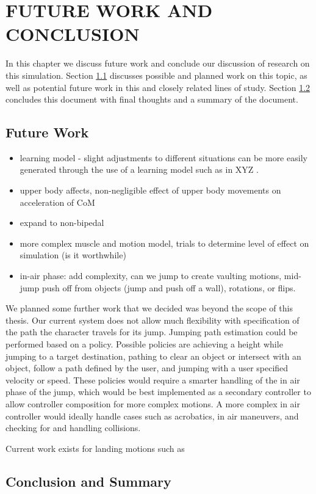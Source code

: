 
 
\chapter{FUTURE WORK AND CONCLUSION}
\label{chapter:future_work}
In this chapter we discuss future work and conclude our discussion of research on this simulation.  Section \ref{section:future_work} discusses possible and planned work on this topic, as well as potential future work in this and closely related lines of study.  Section \ref{section:conclusion} concludes this document with final thoughts and a summary of the document.

\section{Future Work}
\label{section:future_work}
\begin{itemize}
	\item learning model - slight adjustments to different situations can be more easily generated through the use of a learning model such as in XYZ \cite{falling_landing, muscle_based_bipeds}.
	\item upper body affects, non-negligible effect of upper body movements on acceleration of CoM
	\item expand to non-bipedal
	\item more complex muscle and motion model, trials to determine level of effect on simulation (is it worthwhile)
	\item in-air phase: add complexity, can we jump to create vaulting motions, mid-jump push off from objects (jump and push off a wall), rotations, or flips.
\end{itemize}

We planned some further work that we decided was beyond the scope of this thesis.  Our current system does not allow much flexibility with specification of the path the character travels for its jump.  Jumping path estimation could be performed based on a policy.  Possible policies are achieving a height while jumping to a target destination, pathing to clear an object or intersect with an object, follow a path defined by the user, and jumping with a user specified velocity or speed.  These policies would require a smarter handling of the in air phase of the jump, which would be best implemented as a secondary controller to allow controller composition for more complex motions.  A more complex in air controller would ideally handle cases such as acrobatics, in air maneuvers, and checking for and handling collisions.

Current work exists for landing motions such as \liufall

\section{Conclusion and Summary}
\label{section:conclusion}